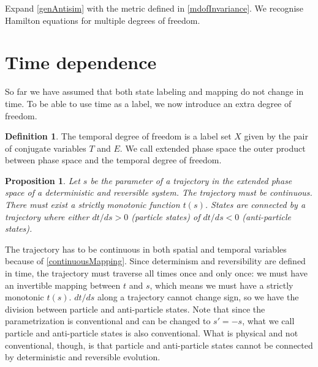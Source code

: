 \documentclass[twocolumn,floatfix,nofootinbib]{revtex4}   %
\theoremstyle{theorem}
\newtheorem{prop}[thm]{Proposition}
\theoremstyle{definition}
\newtheorem{defn}[thm]{Definition}
\begin{document}
Expand \ref{genAntisim} with the metric defined in \ref{mdofInvariance}. We recognise Hamilton equations for multiple degrees of freedom.

\section{Time dependence}
So far we have assumed that both state labeling and mapping do not change in time. To be able to use time as a label, we now introduce an extra degree of freedom.

\begin{defn}\label{tdof}
The temporal degree of freedom is a label set $X$ given by the pair of conjugate variables $T$ and $E$. We call extended phase space the outer product between phase space and the temporal degree of freedom.
\end{defn}

\begin{prop}\label{tdofMonotonic}
Let $s$ be the parameter of a trajectory in the extended phase space of a deterministic and reversible system. The trajectory must be continuous. There must exist a strictly monotonic function $t(s)$. States are connected by a trajectory where either $dt/ds>0$ (particle states) of $dt/ds<0$ (anti-particle states).
\end{prop}

The trajectory has to be continuous in both spatial and temporal variables because of \ref{continuousMapping}. Since determinism and reversibility are defined in time, the trajectory must traverse all times once and only once: we must have an invertible mapping between $t$ and $s$, which means we must have a strictly monotonic $t(s)$. $dt/ds$ along a trajectory cannot change sign, so we have the division between particle and anti-particle states. Note that since the parametrization is conventional and can be changed to $s'=-s$, what we call particle and anti-particle states is also conventional. What is physical and not conventional, though, is that particle and anti-particle states cannot be connected by deterministic and reversible evolution.
\end{document}

